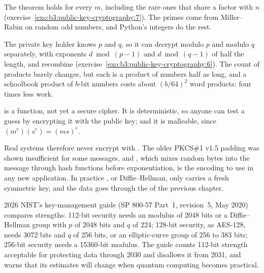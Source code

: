 The theorem holds for every $m$, including the rare ones that share a factor with $n$ (exercise~\ref{exo:b3:public-key-cryptography:7}). The primes come from Miller--Rabin on random odd numbers, and Python's integers do the rest.

\label{lst:b3:public-key-cryptography:rsa}

\label{out:b3:public-key-cryptography:rsa}

The private key holder knows $p$ and $q$, so it can decrypt modulo $p$ and modulo $q$ separately, with exponents $d \bmod (p - 1)$ and $d \bmod (q - 1)$ of half the length, and recombine (exercise~\ref{exo:b3:public-key-cryptography:6}). The count of products barely changes, but each is a product of numbers half as long, and a schoolbook product of $b$-bit numbers costs about $(b/64)^2$ word products: four times less work.

 is a function, not yet a secure cipher. It is deterministic, so anyone can test a guess by encrypting it with the public key; and it is malleable, since $(m^e)(s^e) = (ms)^e$.

\label{out:b3:public-key-cryptography:malleable}

Real systems therefore never encrypt with . The older PKCS\#1 v1.5 padding was shown insufficient for some messages, and , which mixes random bytes into the message through hash functions before exponentiation, is the encoding to use in any new application. %
In practice , or Diffie--Hellman, only carries a fresh symmetric key, and the data goes through the  of the previous chapter.

\begin{dated}{2026}
NIST's key-management guide (SP 800-57 Part~1, revision~5, May 2020) compares strengths: 112-bit security needs an  modulus of 2048 bits or a Diffie--Hellman group with $p$ of 2048 bits and $q$ of 224; 128-bit security, as AES-128, needs 3072 bits and $q$ of 256 bits, or an elliptic-curve group of 256 to 383 bits; 256-bit security needs a 15360-bit modulus. The guide counts 112-bit strength acceptable for protecting data through 2030 and disallows it from 2031, and warns that its estimates will change when quantum computing becomes practical. %
\end{dated}

